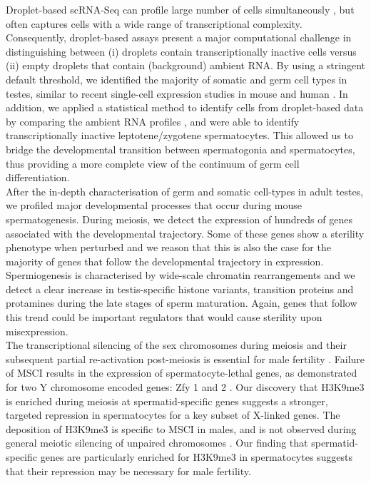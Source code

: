 Droplet-based scRNA-Seq can profile large number of cells simultaneously \citep{Klein2015, Macosko2015, Zheng2017}, but often captures cells with a wide range of transcriptional complexity. Consequently, droplet-based assays present a major computational challenge in distinguishing between (i) droplets contain transcriptionally inactive cells versus (ii) empty droplets that contain (background) ambient RNA. By using a stringent default threshold, we identified the majority of somatic and germ cell types in testes, similar to recent single-cell expression studies in mouse and human \citep{Lukassen2018, Xia2018, Chen2018}. In addition, we applied a statistical method to identify cells from droplet-based data by comparing the ambient RNA profiles \citep{Lun2018}, and were able to identify transcriptionally inactive leptotene/zygotene spermatocytes. This allowed us to bridge the developmental transition between spermatogonia and spermatocytes, thus providing a more complete view of the continuum of germ cell differentiation.\\

After the in-depth characterisation of germ and somatic cell-types in adult testes, we profiled major developmental processes that occur during mouse spermatogenesis. During meiosis, we detect the expression of hundreds of genes associated with the developmental trajectory. Some of these genes show a sterility phenotype when perturbed and we reason that this is also the case for the majority of genes that follow the developmental trajectory in expression. Spermiogenesis is characterised by wide-scale chromatin rearrangements and we detect a clear increase in testis-specific histone variants, transition proteins and protamines during the late stages of sperm maturation. Again, genes that follow this trend could be important regulators that would cause sterility upon misexpression.   \\

The transcriptional silencing of the sex chromosomes during meiosis and their subsequent partial re-activation post-meiosis is essential for male fertility \citep{Mahadevaiah2008}. Failure of \gls{MSCI} results in the expression of spermatocyte-lethal genes, as demonstrated for two Y chromosome encoded genes: \gls{Zfy} 1 and 2 \citep{Royo2010}. Our discovery that H3K9me3 is enriched during meiosis at spermatid-specific genes suggests a stronger, targeted repression in spermatocytes for a key subset of X-linked genes. The deposition of H3K9me3 is specific to MSCI in males, and is not observed during general meiotic silencing of unpaired chromosomes \citep{Cloutier2016, Taketo2013, Turner2004a}. Our finding that spermatid-specific genes are particularly enriched for H3K9me3 in spermatocytes suggests that their repression may be necessary for male fertility. \\

